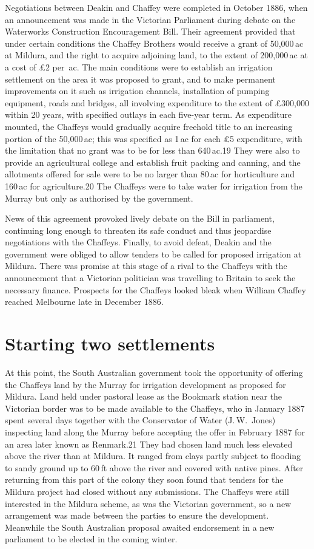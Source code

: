 Negotiations between Deakin and Chaffey were completed in October
1886, when an announcement was made in the Victorian Parliament during
debate on the Waterworks Construction Encouragement Bill.  Their
agreement provided that under certain conditions the Chaffey Brothers
would receive a grant of 50,000\,ac at Mildura, and the right to
acquire adjoining land, to the extent of 200,000\,ac at a cost of
\pounds2 per~ac.  The main conditions were to establish an irrigation
settlement on the area it was proposed to grant, and to make permanent
improvements on it such as irrigation channels, installation of
pumping equipment, roads and bridges, all involving expenditure to the
extent of \pounds300,000 within 20 years, with specified outlays in
each five-year term.  As expenditure mounted, the Chaffeys would
gradually acquire freehold title to an increasing portion of the
50,000\,ac; this was specified as 1\,ac for each \pounds5 expenditure,
with the limitation that no grant was to be for less than 640\,ac.19
They were also to provide an agricultural college and establish fruit
packing and canning, and the allotments offered for sale were to be no
larger than 80\,ac for horticulture and 160\,ac for agriculture.20 The
Chaffeys were to take water for irrigation from the Murray but only as
authorised by the government.

News of this agreement provoked lively debate on the Bill in
parliament, continuing long enough to threaten its safe conduct and
thus jeopardise negotiations with the Chaffeys.  Finally, to avoid
defeat, Deakin and the government were obliged to allow tenders to be
called for proposed irrigation at Mildura.  There was promise at this
stage of a rival to the Chaffeys with the announcement that a
Victorian politician was travelling to Britain to seek the necessary
finance. Prospects for the Chaffeys looked bleak when William Chaffey
reached Melbourne late in December 1886.

\section{Starting two settlements}

At this point, the South Australian government took the opportunity of
offering the Chaffeys land by the Murray for irrigation development as
proposed for Mildura.  Land held under pastoral lease as the Bookmark
station near the Victorian border was to be made available to the
Chaffeys, who in January 1887 spent several days together with the
Conservator of Water (J.\,W.~Jones) inspecting land along the Murray
before accepting the offer in February 1887 for an area later known as
Renmark.21 They had chosen land much less elevated above the river
than at Mildura.  It ranged from clays partly subject to flooding to
sandy ground up to 60\,ft above the river and covered with native
pines.  After returning from this part of the colony they soon found
that tenders for the Mildura project had closed without any
submissions.  The Chaffeys were still interested in the Mildura
scheme, as was the Victorian government, so a new arrangement was made
between the parties to ensure the development.  Meanwhile the South
Australian proposal awaited endorsement in a new parliament to be
elected in the coming winter.

